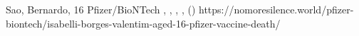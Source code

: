           {Sao, Bernardo, }
          {16}
          {Pfizer/BioNTech}
          {}
          {
            ,
            ,
            ,
            ,
             ()
          }
          {https://nomoresilence.world/pfizer-biontech/isabelli-borges-valentim-aged-16-pfizer-vaccine-death/}


